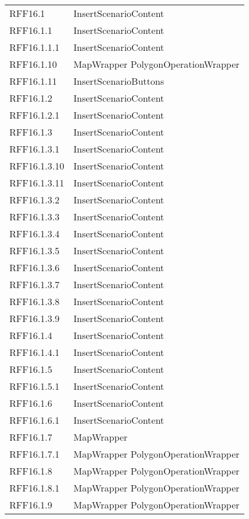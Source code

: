 \begin{longtable}{p{2.5cm}!{\VRule[1pt]}p{5cm}}
		RFF16.1 & InsertScenarioContent\\
		RFF16.1.1 & InsertScenarioContent\\
		RFF16.1.1.1 & InsertScenarioContent\\
		RFF16.1.10 & MapWrapper \newline PolygonOperationWrapper\\
		RFF16.1.11 & InsertScenarioButtons\\
		RFF16.1.2 & InsertScenarioContent\\
		RFF16.1.2.1 & InsertScenarioContent\\
		RFF16.1.3 & InsertScenarioContent\\
		RFF16.1.3.1 & InsertScenarioContent\\
		RFF16.1.3.10 & InsertScenarioContent\\
		RFF16.1.3.11 & InsertScenarioContent\\
		RFF16.1.3.2 & InsertScenarioContent\\
		RFF16.1.3.3 & InsertScenarioContent\\
		RFF16.1.3.4 & InsertScenarioContent\\
		RFF16.1.3.5 & InsertScenarioContent\\
		RFF16.1.3.6 & InsertScenarioContent\\
		RFF16.1.3.7 & InsertScenarioContent\\
		RFF16.1.3.8 & InsertScenarioContent\\
		RFF16.1.3.9 & InsertScenarioContent\\
		RFF16.1.4 & InsertScenarioContent\\
		RFF16.1.4.1 & InsertScenarioContent\\
		RFF16.1.5 & InsertScenarioContent\\
		RFF16.1.5.1 & InsertScenarioContent\\
		RFF16.1.6 & InsertScenarioContent\\
		RFF16.1.6.1 & InsertScenarioContent\\
		RFF16.1.7 & MapWrapper\\
		RFF16.1.7.1 & MapWrapper \newline PolygonOperationWrapper\\
		RFF16.1.8 & MapWrapper \newline PolygonOperationWrapper\\
		RFF16.1.8.1 & MapWrapper \newline PolygonOperationWrapper\\
		RFF16.1.9 & MapWrapper \newline PolygonOperationWrapper\\

\end{longtable}
